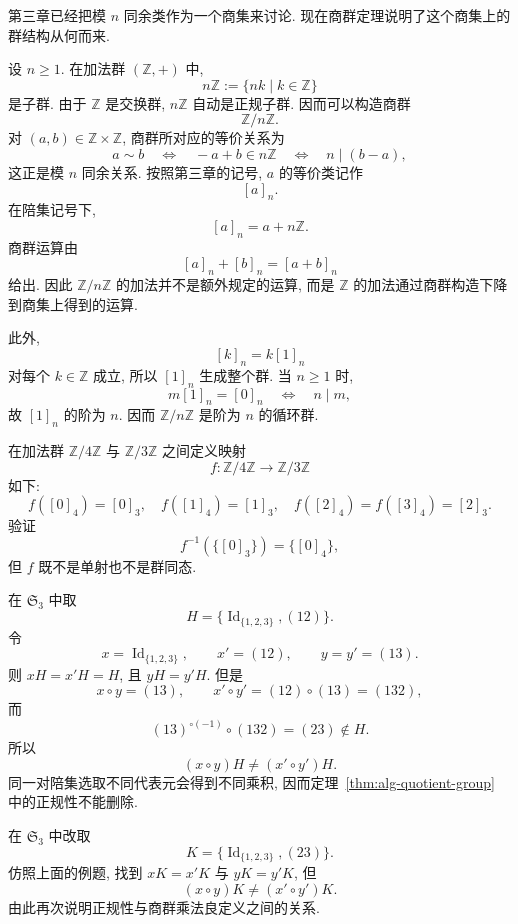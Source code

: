 \documentclass[usesamecnt, thmcnt=section, lang=cn, newtx, 10pt, scheme=chinese]{elegantbook}
\begin{document}
\begin{instance}
第三章已经把模 $n$ 同余类作为一个商集来讨论. 现在商群定理说明了这个商集上的群结构从何而来.

设 $n\geq1$. 在加法群 $(\mathbb Z,+)$ 中,
\[
 n\mathbb Z:=\{nk\mid k\in\mathbb Z\}
\]
是子群. 由于 $\mathbb Z$ 是交换群, $n\mathbb Z$ 自动是正规子群. 因而可以构造商群
\[
 \mathbb Z/n\mathbb Z.
\]
对 $(a,b)\in\mathbb Z\times\mathbb Z$, 商群所对应的等价关系为
\[
 a\sim b
 \quad\Longleftrightarrow\quad
 -a+b\in n\mathbb Z
 \quad\Longleftrightarrow\quad
 n\mid(b-a),
\]
这正是模 $n$ 同余关系. 按照第三章的记号, $a$ 的等价类记作
\[
 [a]_n.
\]
在陪集记号下,
\[
 [a]_n=a+n\mathbb Z.
\]
商群运算由
\[
 [a]_n+[b]_n=[a+b]_n
\]
给出. 因此 $\mathbb Z/n\mathbb Z$ 的加法并不是额外规定的运算, 而是 $\mathbb Z$ 的加法通过商群构造下降到商集上得到的运算.

此外,
\[
 [k]_n=k[1]_n
\]
对每个 $k\in\mathbb Z$ 成立, 所以 $[1]_n$ 生成整个群. 当 $n\geq1$ 时,
\[
 m[1]_n=[0]_n
 \quad\Longleftrightarrow\quad
 n\mid m,
\]
故 $[1]_n$ 的阶为 $n$. 因而 $\mathbb Z/n\mathbb Z$ 是阶为 $n$ 的循环群.
\end{instance}


\begin{exercise}\label{ex:alg-kernel-hypothesis}
在加法群 $\mathbb Z/4\mathbb Z$ 与 $\mathbb Z/3\mathbb Z$ 之间定义映射
\[
 f:\mathbb Z/4\mathbb Z\longrightarrow\mathbb Z/3\mathbb Z
\]
如下:
\[
 f([0]_4)=[0]_3,\quad
 f([1]_4)=[1]_3,\quad
 f([2]_4)=f([3]_4)=[2]_3.
\]
验证
\[
 f^{-1}(\{[0]_3\})=\{[0]_4\},
\]
但 $f$ 既不是单射也不是群同态.
\end{exercise}


\begin{instance}
在 $\mathfrak S_3$ 中取
\[
 H=\{\operatorname{Id}_{\{1,2,3\}},(12)\}.
\]
令
\[
 x=\operatorname{Id}_{\{1,2,3\}},\qquad x'=(12),\qquad y=y'=(13).
\]
则 $xH=x'H=H$, 且 $yH=y'H$. 但是
\[
 x\circ y=(13),\qquad
 x'\circ y'=(12)\circ(13)=(132),
\]
而
\[
 (13)^{\circ(-1)}\circ(132)=(23)\notin H.
\]
所以
\[
 (x\circ y)H\neq(x'\circ y')H.
\]
同一对陪集选取不同代表元会得到不同乘积, 因而定理~\ref{thm:alg-quotient-group} 中的正规性不能删除.
\end{instance}

\begin{exercise}\label{ex:alg-normal-essential}
在 $\mathfrak S_3$ 中改取
\[
 K=\{\operatorname{Id}_{\{1,2,3\}},(23)\}.
\]
仿照上面的例题, 找到 $xK=x'K$ 与 $yK=y'K$, 但
\[
 (x\circ y)K\neq(x'\circ y')K.
\]
由此再次说明正规性与商群乘法良定义之间的关系.
\end{exercise}
\end{document}

